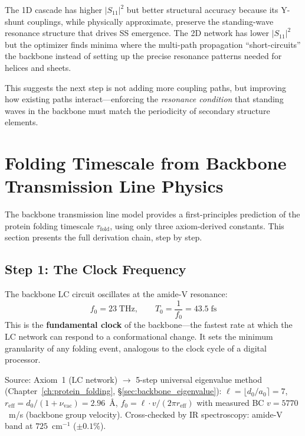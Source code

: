 The 1D cascade has higher $|S_{11}|^2$ but better structural accuracy because its Y-shunt couplings, while physically approximate, preserve the standing-wave resonance structure that drives SS emergence.
The 2D network has lower $|S_{11}|^2$ but the optimizer finds minima where the multi-path propagation ``short-circuits'' the backbone instead of setting up the precise resonance patterns needed for helices and sheets.

This suggests the next step is not adding more coupling paths, but improving how existing paths interact---enforcing the \emph{resonance condition} that standing waves in the backbone must match the periodicity of secondary structure elements.

\section{Folding Timescale from Backbone Transmission Line Physics}
\label{sec:tau_fold}

The backbone transmission line model provides a first-principles prediction of the protein folding timescale $\tau_\text{fold}$, using only three axiom-derived constants.
This section presents the full derivation chain, step by step.

\subsection{Step 1: The Clock Frequency}
\label{sec:clock}

The backbone LC circuit oscillates at the amide-V resonance:
\begin{equation}
    f_0 = 23\;\text{THz}, \qquad T_0 = \frac{1}{f_0} = 43.5\;\text{fs}
    \label{eq:f0_clock}
\end{equation}
This is the \textbf{fundamental clock} of the backbone---the fastest rate at which the LC network can respond to a conformational change.  It sets the minimum granularity of any folding event, analogous to the clock cycle of a digital processor.

Source: Axiom~1 (LC network) $\to$ 5-step universal eigenvalue method
(Chapter~\ref{ch:protein_folding}, \S\ref{sec:backbone_eigenvalue}):
$\ell = \lfloor d_0/a_0 \rceil = 7$,
$r_\text{eff} = d_0/(1+\nu_\text{vac}) = 2.96$~\AA,
$f_0 = \ell \cdot v / (2\pi r_\text{eff})$ with measured BC
$v = 5770$~m/s (backbone group velocity).  Cross-checked by
IR spectroscopy: amide-V band at $725$~cm$^{-1}$ ($\pm 0.1\%$).


